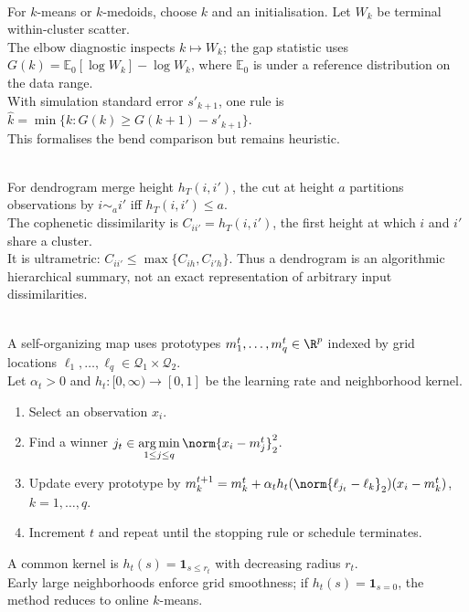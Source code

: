 \begin{remark} \label{rem:sl-clustering-practical-choices} \\
For $k$-means or $k$-medoids, choose $k$ and an initialisation. Let $W_k$ be terminal within-cluster scatter.\\
The elbow diagnostic inspects $k\mapsto W_k$; the gap statistic uses $G(k)=\mathbb{E}_0[\log W_k]-\log W_k$, where $\mathbb{E}_0$ is under a reference distribution on the data range.\\
With simulation standard error $s'_{k+1}$, one rule is $\widehat{k}=\min\{k:G(k)\geq G(k+1)-s'_{k+1}\}$.\\
This formalises the bend comparison but remains heuristic.
\end{remark}

\begin{remark} \label{rem:sl-dendrogram-cophenetic-distances} \\
For dendrogram merge height $h_T(i,i')$, the cut at height $a$ partitions observations by $i\sim_a i'$ iff $h_T(i,i')\leq a$.\\
The cophenetic dissimilarity is $C_{ii'}=h_T(i,i')$, the first height at which $i$ and $i'$ share a cluster.\\
It is ultrametric: $C_{ii'}\leq\max\{C_{ih},C_{i'h}\}$. Thus a dendrogram is an algorithmic hierarchical summary, not an exact representation of arbitrary input dissimilarities.
\end{remark}

\begin{method} \label{meth:sl-self-organizing-map} \\
A self-organizing map uses prototypes $m_1^t,\ldots,m_q^t\in\R^p$ indexed by grid locations $\ell_1,\ldots,\ell_q\in\mathcal Q_1\times\mathcal Q_2$.\\
Let $\alpha_t>0$ and $h_t:[0,\infty)\to[0,1]$ be the learning rate and neighborhood kernel.
\begin{enumerate}[label=(\roman*)]
\setlength{\itemsep}{0pt}
\item Select an observation $x_i$.
\item Find a winner $j_t\in\operatorname*{arg\,min}\limits_{1\leq j\leq q}\norm{x_i-m_j^t}_2^2$.
\item Update every prototype by $m_k^{t+1}=m_k^t+\alpha_t h_t(\norm{\ell_{j_t}-\ell_k}_2)(x_i-m_k^t)$, $k=1,\ldots,q$.
\item Increment $t$ and repeat until the stopping rule or schedule terminates.
\end{enumerate}
A common kernel is $h_t(s)=\mathbf{1}_{s\leq r_t}$ with decreasing radius $r_t$.\\
Early large neighborhoods enforce grid smoothness; if $h_t(s)=\mathbf{1}_{s=0}$, the method reduces to online $k$-means.
\end{method}

